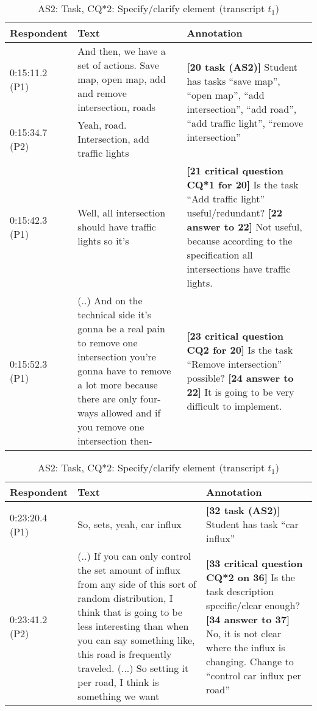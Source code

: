 \begin{table}[!htbp]
\begin{tabular}{|p{20mm}|p{70mm}|p{60mm}|}
\hline
Respondent & Text & Annotation\\
\hline
0:15:11.2 (P1) & And then, we have a set of actions. Save map, open map, add and remove intersection, roads & \multirow{2}{60mm}{\textbf{[20 task (AS2)]} Student has tasks ``save map'', ``open map'', ``add intersection'', ``add road'', ``add traffic light'', ``remove intersection''}\\
\cline{1-2}
0:15:34.7 (P2) & Yeah, road. Intersection, add traffic lights	&\\
\hline
0:15:42.3 (P1) & Well, all intersection should have traffic lights so it's & \textbf{[21 critical question CQ*1 for 20]} Is the task ``Add traffic light'' useful/redundant? \newline
\textbf{[22 answer to 22]} Not useful, because according to the specification all intersections have traffic lights.\\
\hline
0:15:52.3 (P1) & (..) And on the technical side it's gonna be a real pain to remove one intersection you're gonna have to remove a lot more because there are only four-ways allowed and if you remove one intersection then-& \textbf{[23 critical question CQ2 for 20]} Is the task ``Remove intersection'' possible?\newline
\textbf{[24 answer to 22]} It is going to be very difficult to implement.\\
\hline
\end{tabular}
\caption{AS2: Task, CQ*1: Redundant element, CQ2: impossible task (transcript $t_1$)}
\label{table:transcript:as2-cq_star_1-cq2}

\begin{tabular}{|p{20mm}|p{70mm}|p{60mm}|}
\hline
Respondent & Text & Annotation\\
\hline
0:23:20.4 (P1) & So, sets, yeah, car influx & \textbf{[32 task (AS2)]} Student has task ``car influx''\\
\hline
0:23:41.2 (P2) & (..) If you can only control the set amount of influx from any side of this sort of random distribution, I think that is going to be less interesting than when you can say something like, this road is frequently traveled. (...) So setting it per road, I think is something we want & \textbf{[33 critical question CQ*2 on 36]} Is the task description specific/clear enough? \newline
\textbf{[34 answer to 37]} No, it is not clear where the influx is changing. Change to ``control car influx per road''\\
\hline
\end{tabular}
\caption{AS2: Task, CQ*2: Specify/clarify element (transcript $t_1$)}
\label{table:transcript:as2-cq_star_2}


\end{table}
